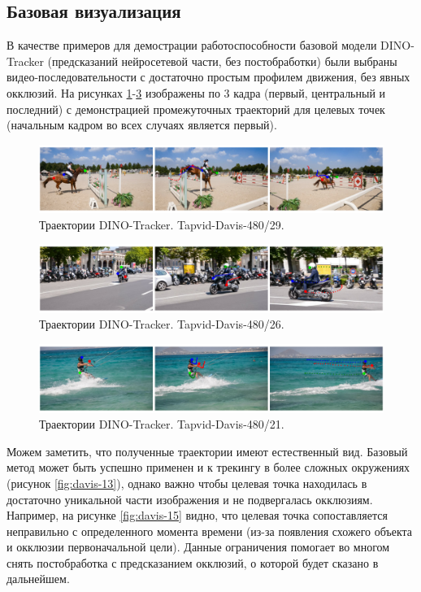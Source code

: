 \documentclass[a4paper, 14pt]{extarticle}
\theoremstyle{definition}
\theoremstyle{plain}
\theoremstyle{remark}
\begin{document}
\subsection{Базовая визуализация}
В качестве примеров для демострации работоспособности базовой модели DINO-Tracker (предсказаний нейросетевой части, без постобработки) были выбраны видео-последовательности с достаточно простым профилем движения, без явных окклюзий. На рисунках \ref{fig:davis-29}-\ref{fig:davis-21} изображены по 3 кадра (первый, центральный и последний) с демонстрацией промежуточных траекторий для целевых точек (начальным кадром во всех случаях является первый).
\begin{figure}
    [H]
    \centering
    \includegraphics[width=\textwidth]{figs/davis-29.png}
    \caption{Траектории DINO-Tracker. Tapvid-Davis-480/29.}
    \label{fig:davis-29}
\end{figure}
\begin{figure}
    [H]
    \centering
    \includegraphics[width=\textwidth]{figs/davis-26.png}
    \caption{Траектории DINO-Tracker. Tapvid-Davis-480/26.}
    \label{fig:davis-26}
\end{figure}
\begin{figure}
    [H]
    \centering
    \includegraphics[width=\textwidth]{figs/davis-21.png}
    \caption{Траектории DINO-Tracker. Tapvid-Davis-480/21.}
    \label{fig:davis-21}
\end{figure}

Можем заметить, что полученные траектории имеют естественный вид. 
Базовый метод может быть успешно применен и к трекингу в более сложных окружениях 
(рисунок \ref{fig:davis-13}), однако важно чтобы целевая точка находилась в достаточно 
уникальной части изображения и не подвергалась окклюзиям. Например, на рисунке 
\ref{fig:davis-15} видно, что целевая точка сопоставляется неправильно с определенного 
момента времени (из-за появления схожего объекта и окклюзии первоначальной цели). 
Данные ограничения помогает во многом снять постобработка с предсказанием окклюзий, 
о которой будет сказано в дальнейшем.
\end{document}
